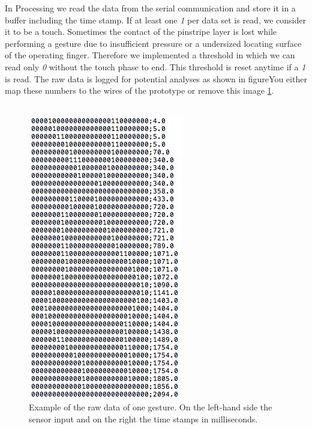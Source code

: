 In Processing we read the data from the serial communication and store it in a buffer including the time stamp.  If at least one \emph{1} per data set is read, we consider it to be a touch. Sometimes the contact of the pinstripe layer is lost while performing a gesture due to insufficient pressure or a undersized locating surface of the operating finger. Therefore we implemented a threshold in which we can read only \emph{0} without the touch phase to end. This threshold is reset anytime if a \emph{1} is read. The raw data is logged for potential analyses as shown in figureYou either map these numbers to the wires of the prototype or remove this image \ref{fig:rawDataExample}.
\\ \\

\begin{figure}
\includegraphics[scale=0.7]{images/rawDataExample.jpg}
\caption{Example of the raw data of one gesture. On the left-hand side the sensor input and on the right the time stamps in milliseconds.}
\label{fig:rawDataExample}
\end{figure}

